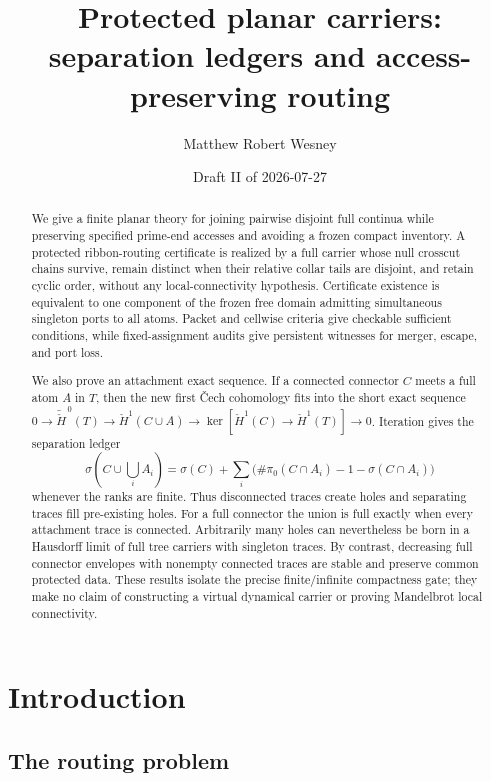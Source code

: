 \documentclass[11pt,reqno]{amsart}
\title[Protected planar carriers]{Protected planar carriers:\\
separation ledgers and access-preserving routing}
\author{Matthew Robert Wesney}
\date{Draft II of 2026-07-27}
\theoremstyle{definition}
\theoremstyle{remark}
\begin{document}
\begin{abstract}
We give a finite planar theory for joining pairwise disjoint full continua
while preserving specified prime-end accesses and avoiding a frozen compact
inventory.  A protected ribbon-routing certificate is realized by a full
carrier whose null crosscut chains survive, remain distinct when their
relative collar tails are disjoint, and retain cyclic order, without any
local-connectivity hypothesis.  Certificate existence is equivalent to one
component of the frozen free domain admitting simultaneous singleton ports
to all atoms.  Packet and cellwise criteria give checkable sufficient
conditions, while fixed-assignment audits give persistent witnesses for
merger, escape, and port loss.

We also prove an attachment exact sequence.  If a connected connector $C$
meets a full atom $A$ in $T$, then the new first \v{C}ech cohomology fits into
the short exact sequence
$0\to\widetilde{\check H}^{\,0}(T)\to
\check H^1(C\cup A)\to
\ker[\check H^1(C)\to\check H^1(T)]\to0$.
Iteration gives the separation ledger
\[
\sigma\!\left(C\cup\bigcup_iA_i\right)
=\sigma(C)+\sum_i
\bigl(\#\pi_0(C\cap A_i)-1-\sigma(C\cap A_i)\bigr)
\]
whenever the ranks are finite.  Thus disconnected traces create holes and
separating traces fill pre-existing holes.  For a full connector the union
is full exactly when every attachment trace is connected.  Arbitrarily many
holes can nevertheless be born in a Hausdorff limit of full tree carriers
with singleton traces.  By contrast, decreasing full connector envelopes
with nonempty connected traces are stable and preserve common protected
data.
These results isolate the precise finite/infinite compactness gate; they make
no claim of constructing a virtual dynamical carrier or proving Mandelbrot
local connectivity.
\end{abstract}

\maketitle
\tableofcontents


\section{Introduction}\label{sec:intro}

\subsection{The routing problem}
\end{document}
